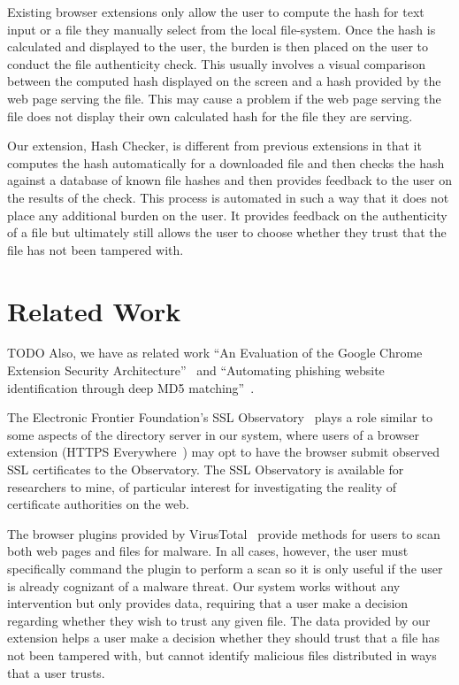 \documentclass[letterpaper,twocolumn,10pt]{article}
\begin{document}
Existing browser extensions only allow the user to compute the hash for text input or a file they manually select from the local file-system. Once the hash is calculated and displayed to the user, the burden is then placed on the user to conduct the file authenticity check. This usually involves a visual comparison between the computed hash displayed on the screen and a hash provided by the web page serving the file. This may cause a problem if the web page serving the file does not display their own calculated hash for the file they are serving.

Our extension, Hash Checker, is different from previous extensions in that it computes the hash automatically for a downloaded file and then checks the hash against a database of known file hashes and then provides feedback to the user on the results of the check. This process is automated in such a way that it does not place any additional burden on the user. It provides feedback on the authenticity of a file but ultimately still allows the user to choose whether they trust that the file has not been tampered with.

\section{Related Work}

TODO Also, we have as related work ``An Evaluation of the Google Chrome Extension Security Architecture''~\cite{180206} and ``Automating phishing website identification through deep MD5 matching''~\cite{Wardman}.

The Electronic Frontier Foundation's SSL Observatory~\cite{ssl-observatory} plays a role
similar to some aspects of the directory server in our system, where users of a browser
extension (HTTPS Everywhere~\cite{https-everywhere}) may opt to have the browser
submit observed SSL certificates to the Observatory. The SSL Observatory is available for
researchers to mine, of particular interest for investigating the reality of certificate authorities
on the web.

The browser plugins provided by VirusTotal~\cite{vtzilla,vtchromizer,vtexplorer} provide
methods for users to scan both web pages and files for malware. In all cases, however, the
user must specifically command the plugin to perform a scan so it is only useful if the user
is already cognizant of a malware threat. Our system works without any intervention
but only provides data, requiring that a user make a decision regarding whether they wish
to trust any given file. The data provided by our extension helps a user make a decision
whether they should trust that a file has not been tampered with, but cannot identify
malicious files distributed in ways that a user trusts.
\end{document}
